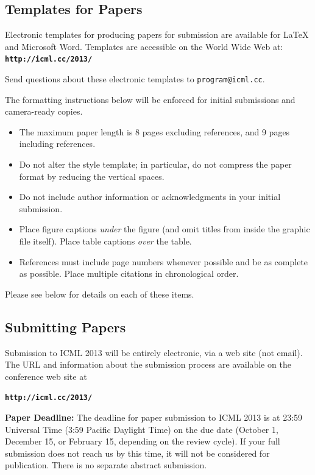 \documentclass{article}
\begin{document}
\subsection{Templates for Papers}

Electronic templates for producing papers for submission are available
for \LaTeX\/ and Microsoft Word. Templates are accessible on the World
Wide Web at:\\
\textbf{\texttt{http://icml.cc/2013/}}

\noindent
Send questions about these electronic templates to
\texttt{program@icml.cc}.

The formatting instructions below will be enforced for initial submissions and camera-ready copies. 
\begin{itemize}
\item The maximum paper length is 8 pages excluding references, and 
9 pages including references.
\item Do not alter the style template; in particular, do not compress the paper format 
by reducing the vertical spaces.
\item Do not include author information or acknowledgments in your
  initial submission. 
\item Place figure captions {\em under} the figure (and omit titles from
  inside the graphic file itself).  Place table captions {\em over}
  the table.
\item References must include page numbers whenever possible and be as
  complete as possible.  Place multiple citations in chronological order.  
\end{itemize}
Please see below for details on each of these items.

\subsection{Submitting Papers}

Submission to ICML 2013 will be entirely electronic, via a web site
(not email).  The URL and information about the submission process
are available on the conference web site at

\textbf{\texttt{http://icml.cc/2013/}}

{\bf Paper Deadline:} The deadline for paper submission to ICML 2013
is at 23:59 Universal Time (3:59 Pacific Daylight Time) on the due date
(October 1, December 15, or February 15, depending on the review cycle).  
If your full submission does not reach us by this time, it will 
not be considered for publication. There is no separate abstract submission.
\end{document}
